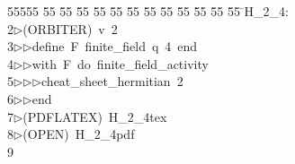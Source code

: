 %
%
\begin{tabbing}
55555 \= 55 \= 55 \= 55 \= 55 \= 55 \= 55 \= 55 \= 55 \= 55 \= 55 \= 55 \= 55 \= \>H\_2\_4:\\[0pt]
2\>$\triangleright$\>(ORBITER)\ v\ 2\ \\[0pt]
3\>$\triangleright$\>$\triangleright$\>define\ F\ finite\_field\ q\ 4\ end\ \\[0pt]
4\>$\triangleright$\>$\triangleright$\>with\ F\ do\ finite\_field\_activity\ \\[0pt]
5\>$\triangleright$\>$\triangleright$\>$\triangleright$\>cheat\_sheet\_hermitian\ 2\ \\[0pt]
6\>$\triangleright$\>$\triangleright$\>end\\[0pt]
7\>$\triangleright$\>(PDFLATEX)\ H\_2\_4tex\ \\[0pt]
8\>$\triangleright$\>(OPEN)\ H\_2\_4pdf\\[0pt]
9\>\end{tabbing}
